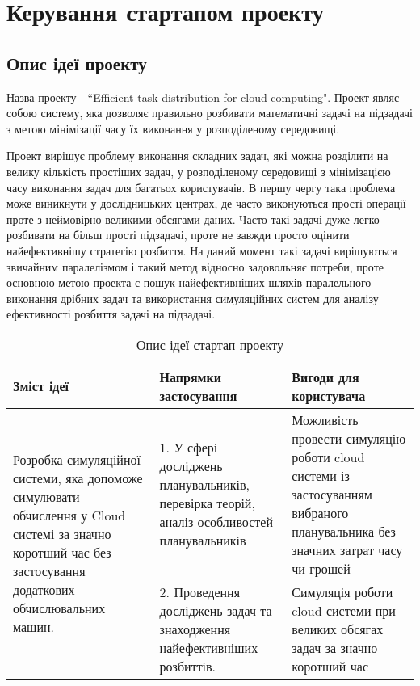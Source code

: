 
\chapter{Керування стартапом проекту}
\section{Опис ідеї проекту}
Назва проекту - ``Efficient task distribution for cloud computing". Проект являє собою систему, яка дозволяє правильно розбивати математичні задачі на підзадачі з метою мінімізації часу їх виконання у розподіленому середовищі.

Проект вирішує проблему виконання складних задач, які можна розділити на велику кількість простіших задач, у розподіленому середовищі з мінімізацією часу виконання задач для багатьох користувачів. В першу чергу така проблема може виникнути у дослідницьких центрах, де часто виконуються прості операції проте з неймовірно великими обсягами даних. Часто такі задачі дуже легко розбивати на більш прості підзадачі, проте не завжди просто оцінити найефективнішу стратегію розбиття. На даний момент такі задачі вирішуються звичайним паралелізмом і такий метод відносно задовольняє потреби, проте основною метою проекта є пошук найефективніших шляхів паралельного виконання дрібних задач та використання симуляційних систем для аналізу ефективності розбиття задачі на підзадачі. 

\begin{table}[H]
	\centering
	\caption{Опис ідеї стартап-проекту}
	\begin{center}
		\begin{tabular}{|p{5cm}|p{5cm}|p{5cm}|}
			\hline
			\bf{Зміст ідеї} & \bf{Напрямки застосування} & \bf{Вигоди для користувача}
			\\ \hline
			\multirow{2}{5cm}{
				Розробка симуляційної системи, яка допоможе симулювати
				обчислення у Cloud системі за значно коротший час без застосування додаткових обчислювальних машин.
			}                           
			& 1. У сфері досліджень планувальників, перевірка теорій, аналіз особливостей планувальників
			& Можливість провести симуляцію роботи cloud системи із застосуванням вибраного планувальника без значних затрат часу чи грошей
			\\ \cline{2-3}
			
			& 2. Проведення досліджень задач та знаходження найефективніших розбиттів.
			& Симуляція роботи cloud системи при великих обсягах задач за значно коротший час
			\\ \hline
		\end{tabular}
	\end{center}
\end{table}

